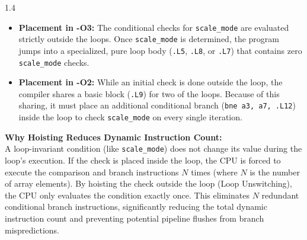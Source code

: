 \documentclass[12pt, a4paper]{article}
\begin{document}
\vspace{0.3cm}
\noindent{}
\vspace{-0.2cm}
\begin{spacing}{1.4}
\begin{itemize}[leftmargin=*]
    \item \textbf{Placement in -O3:} The conditional checks for \texttt{scale\_mode} are evaluated strictly outside the loops. Once \texttt{scale\_mode} is determined, the program jumps into a specialized, pure loop body (\texttt{.L5}, \texttt{.L8}, or \texttt{.L7}) that contains zero \texttt{scale\_mode} checks.
    \item \textbf{Placement in -O2:} While an initial check is done outside the loop, the compiler shares a basic block (\texttt{.L9}) for two of the loops. Because of this sharing, it must place an additional conditional branch (\texttt{bne a3, a7, .L12}) inside the loop to check \texttt{scale\_mode} on every single iteration.
\end{itemize}

\noindent
\textbf{Why Hoisting Reduces Dynamic Instruction Count:} \\
A loop-invariant condition (like \texttt{scale\_mode}) does not change its value during the loop's execution. If the check is placed inside the loop, the CPU is forced to execute the comparison and branch instructions $N$ times (where $N$ is the number of array elements). By hoisting the check outside the loop (Loop Unswitching), the CPU only evaluates the condition exactly once. This eliminates $N$ redundant conditional branch instructions, significantly reducing the total dynamic instruction count and preventing potential pipeline flushes from branch mispredictions.
\end{spacing}
\end{document}
